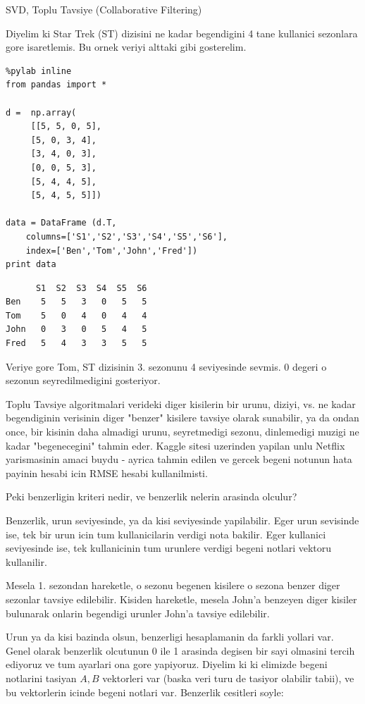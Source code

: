 \documentclass[12pt,fleqn]{article}\usepackage{../common}
\begin{document}
SVD, Toplu Tavsiye (Collaborative Filtering) 

Diyelim ki Star Trek (ST) dizisini ne kadar begendigini 4 tane
kullanici sezonlara gore isaretlemis. Bu ornek veriyi alttaki gibi
gosterelim.

\begin{verbatim}
%pylab inline
from pandas import *

d =  np.array(
     [[5, 5, 0, 5],
     [5, 0, 3, 4],
     [3, 4, 0, 3],
     [0, 0, 5, 3],
     [5, 4, 4, 5],
     [5, 4, 5, 5]])

data = DataFrame (d.T,
    columns=['S1','S2','S3','S4','S5','S6'],
    index=['Ben','Tom','John','Fred'])
print data
\end{verbatim}

\begin{verbatim}
      S1  S2  S3  S4  S5  S6
Ben    5   5   3   0   5   5
Tom    5   0   4   0   4   4
John   0   3   0   5   4   5
Fred   5   4   3   3   5   5
\end{verbatim}

Veriye gore Tom, ST dizisinin 3. sezonunu 4 seviyesinde sevmis. 0
degeri o sezonun seyredilmedigini gosteriyor.

Toplu Tavsiye algoritmalari verideki diger kisilerin bir urunu,
diziyi, vs. ne kadar begendiginin verisinin diger "benzer" kisilere
tavsiye olarak sunabilir, ya da ondan once, bir kisinin daha almadigi
urunu, seyretmedigi sezonu, dinlemedigi muzigi ne kadar
"begenecegini" tahmin eder. Kaggle sitesi uzerinden yapilan unlu Netflix
yarismasinin amaci buydu - ayrica tahmin edilen ve gercek begeni notunun
hata payinin hesabi icin RMSE hesabi kullanilmisti.

Peki benzerligin kriteri nedir, ve benzerlik nelerin arasinda olculur?

Benzerlik, urun seviyesinde, ya da kisi seviyesinde yapilabilir. Eger
urun sevisinde ise, tek bir urun icin tum kullanicilarin verdigi nota
bakilir. Eger kullanici seviyesinde ise, tek kullanicinin tum urunlere
verdigi begeni notlari vektoru kullanilir. 

Mesela 1. sezondan hareketle, o sezonu begenen kisilere o sezona
benzer diger sezonlar tavsiye edilebilir. Kisiden hareketle, mesela
John'a benzeyen diger kisiler bulunarak onlarin begendigi urunler John'a
tavsiye edilebilir.

Urun ya da kisi bazinda olsun, benzerligi hesaplamanin da farkli
yollari var.  Genel olarak benzerlik olcutunun 0 ile 1 arasinda
degisen bir sayi olmasini tercih ediyoruz ve tum ayarlari ona gore
yapiyoruz. Diyelim ki ki elimizde begeni notlarini tasiyan $A,B$
vektorleri var (baska veri turu de tasiyor olabilir tabii), ve bu
vektorlerin icinde begeni notlari var. Benzerlik cesitleri soyle:
\end{document}
